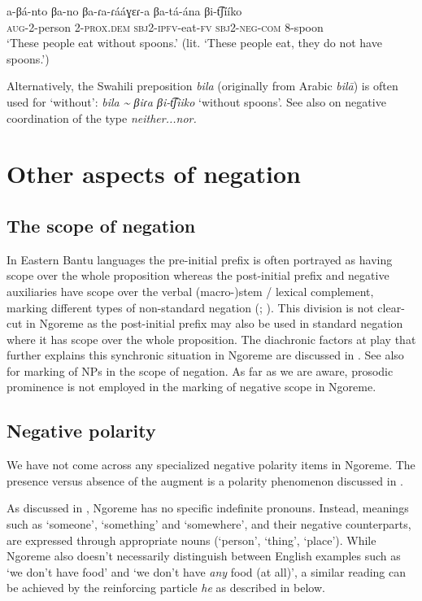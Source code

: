 \documentclass[output=paper,colorlinks,citecolor=brown,draftmode]{langscibook}
\begin{document}
\ea\label{ex:ngo:75} 
    \gll a{}-βá{}-nto βa{}-no βa-ɾa-ɾááɣɛɾ{}-a βa-tá{}-ána βi{}-t͡ʃííko\\ 
        \textsc{aug-}2-person 2-\textsc{prox.dem} \textsc{sbj}2\textsc{{}-ipfv}{}-eat-\textsc{fv} \textsc{sbj}2-\textsc{neg-com} 8-spoon\\
    \glt ‘These people eat without spoons.’ (lit. ‘These people eat, they do not have spoons.’)
\z 

Alternatively, the Swahili preposition \textit{bila} (originally from Arabic \textit{bilā}) is often used for ‘without’: \textit{bila {\textasciitilde} βiɾa βi-t͡ʃiiko} ‘without spoons’. See also  on negative coordination of the type \textit{neither...nor.} 

\section{Other aspects of negation}\label{sec:ngo:4}
\subsection{The scope of negation}\label{sec:ngo:4.1}

In Eastern Bantu languages the pre-initial prefix is often portrayed as having scope over the whole proposition whereas the post-initial prefix and negative auxiliaries have scope over the verbal (macro-)stem / lexical complement, marking different types of non-standard negation (\citealt[193--194]{Nurse2008}; \citealt{Güldemann1999}). This division is not clear-cut in Ngoreme as the post-initial prefix may also be used in standard negation where it has scope over the whole proposition. The diachronic factors at play that further explains this synchronic situation in Ngoreme are discussed in . See also  for marking of NPs in the scope of negation. As far as we are aware, prosodic prominence is not employed in the marking of negative scope in Ngoreme.

\subsection{Negative polarity}\label{sec:ngo:4.2}

We have not come across any specialized negative polarity items in Ngoreme. The presence versus absence of the augment is a polarity phenomenon discussed in . 

As discussed in , Ngoreme has no specific indefinite pronouns. Instead, meanings such as ‘someone’, ‘something’ and ‘somewhere’, and their negative counterparts, are expressed through appropriate nouns (‘person’, ‘thing’, ‘place’). While Ngoreme also doesn’t necessarily distinguish between English examples such as ‘we don’t have food' and ‘we don’t have \textit{any} food (at all)’, a similar reading can be achieved by the reinforcing particle \textit{he} as described in  below.
\end{document}
